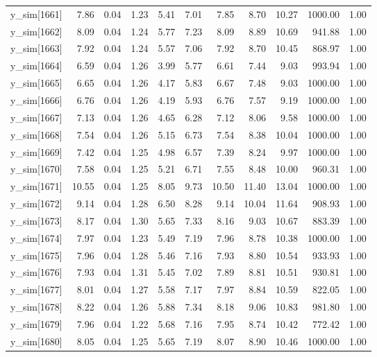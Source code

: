 \begin{table}[ht]
\begin{tabular}{rrrrrrrrrrr}
  y\_sim[1661] & 7.86 & 0.04 & 1.23 & 5.41 & 7.01 & 7.85 & 8.70 & 10.27 & 1000.00 & 1.00 \\ 
  y\_sim[1662] & 8.09 & 0.04 & 1.24 & 5.77 & 7.23 & 8.09 & 8.89 & 10.69 & 941.88 & 1.00 \\ 
  y\_sim[1663] & 7.92 & 0.04 & 1.24 & 5.57 & 7.06 & 7.92 & 8.70 & 10.45 & 868.97 & 1.00 \\ 
  y\_sim[1664] & 6.59 & 0.04 & 1.26 & 3.99 & 5.77 & 6.61 & 7.44 & 9.03 & 993.94 & 1.00 \\ 
  y\_sim[1665] & 6.65 & 0.04 & 1.26 & 4.17 & 5.83 & 6.67 & 7.48 & 9.03 & 1000.00 & 1.00 \\ 
  y\_sim[1666] & 6.76 & 0.04 & 1.26 & 4.19 & 5.93 & 6.76 & 7.57 & 9.19 & 1000.00 & 1.00 \\ 
  y\_sim[1667] & 7.13 & 0.04 & 1.26 & 4.65 & 6.28 & 7.12 & 8.06 & 9.58 & 1000.00 & 1.00 \\ 
  y\_sim[1668] & 7.54 & 0.04 & 1.26 & 5.15 & 6.73 & 7.54 & 8.38 & 10.04 & 1000.00 & 1.00 \\ 
  y\_sim[1669] & 7.42 & 0.04 & 1.25 & 4.98 & 6.57 & 7.39 & 8.24 & 9.97 & 1000.00 & 1.00 \\ 
  y\_sim[1670] & 7.58 & 0.04 & 1.25 & 5.21 & 6.71 & 7.55 & 8.48 & 10.00 & 960.31 & 1.00 \\ 
  y\_sim[1671] & 10.55 & 0.04 & 1.25 & 8.05 & 9.73 & 10.50 & 11.40 & 13.04 & 1000.00 & 1.00 \\ 
  y\_sim[1672] & 9.14 & 0.04 & 1.28 & 6.50 & 8.28 & 9.14 & 10.04 & 11.64 & 908.93 & 1.00 \\ 
  y\_sim[1673] & 8.17 & 0.04 & 1.30 & 5.65 & 7.33 & 8.16 & 9.03 & 10.67 & 883.39 & 1.00 \\ 
  y\_sim[1674] & 7.97 & 0.04 & 1.23 & 5.49 & 7.19 & 7.96 & 8.78 & 10.38 & 1000.00 & 1.00 \\ 
  y\_sim[1675] & 7.96 & 0.04 & 1.28 & 5.46 & 7.16 & 7.93 & 8.80 & 10.54 & 933.93 & 1.00 \\ 
  y\_sim[1676] & 7.93 & 0.04 & 1.31 & 5.45 & 7.02 & 7.89 & 8.81 & 10.51 & 930.81 & 1.00 \\ 
  y\_sim[1677] & 8.01 & 0.04 & 1.27 & 5.58 & 7.17 & 7.97 & 8.84 & 10.59 & 822.05 & 1.00 \\ 
  y\_sim[1678] & 8.22 & 0.04 & 1.26 & 5.88 & 7.34 & 8.18 & 9.06 & 10.83 & 981.80 & 1.00 \\ 
  y\_sim[1679] & 7.96 & 0.04 & 1.22 & 5.68 & 7.16 & 7.95 & 8.74 & 10.42 & 772.42 & 1.00 \\ 
  y\_sim[1680] & 8.05 & 0.04 & 1.25 & 5.65 & 7.19 & 8.07 & 8.90 & 10.46 & 1000.00 & 1.00 \\ 

\end{tabular}
\end{table}
